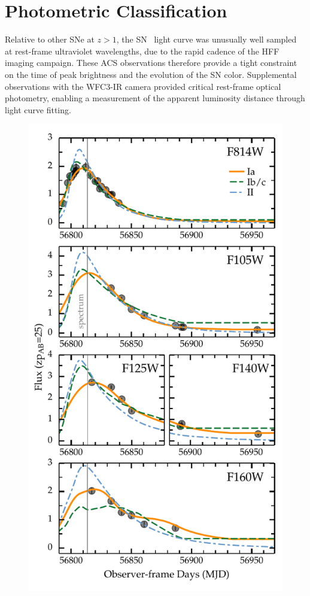 \section{Photometric Classification}
\label{sec:PhotometricClassification}

Relative to other SNe at $z>1$, the SN \tomas\ light curve was
unusually well sampled at rest-frame ultraviolet wavelengths, due to
the rapid cadence of the HFF imaging campaign. These ACS observations
therefore provide a tight constraint on the time of peak brightness
and the evolution of the SN color.  Supplemental observations with the
WFC3-IR camera provided critical rest-frame optical photometry,
enabling a measurement of the apparent luminosity distance through
light curve fitting.

\begin{figure}
\begin{center}
\includegraphics[width=\columnwidth]{FIG/snTomas_lightcurve_classification}

\end{center}
\end{figure}
